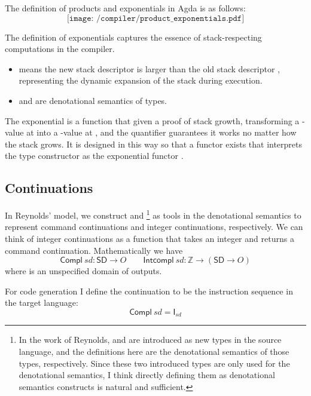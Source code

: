 \documentclass[12pt,a4paper]{report}
\theoremstyle{definition}
\newcommand{\bZ}{\ensuremath{\mathbb{Z}}}
\newcommand{\intp}[1]{\left\llbracket #1 \right\rrbracket}
\begin{document}
    The definition of products and exponentials in Agda is as follows:
    \[\texttt{[image: /compiler/product\_exponentials.pdf]}\]

    The definition of exponentials captures the essence of stack-respecting computations in the compiler. 
    \begin{itemize}
        \item {} means the new stack descriptor  is larger than the old stack descriptor , representing the dynamic expansion of the stack during execution.

        \item {} and  are denotational semantics of types. 
    \end{itemize}
    The exponential  is a function that given a proof of stack growth, transforming a -value at  into a -value at , and the  quantifier guarantees it works no matter how the stack grows. It is designed in this way so that a functor \text{\intp{-} : \Theta \to \mathcal{K}} exists that interprets the type constructor \text{\Rightarrow} as the exponential functor .

    \subsection{Continuations}
    In Reynolds' model, we construct  and \footnote{In the work of Reynolds,  and  are introduced as new types in the source language, and the definitions here are the denotational semantics of those types, respectively. Since these two introduced types are only used for the denotational semantics, I think directly defining them as denotational semantics constructs is natural and sufficient.} as tools in the denotational semantics to represent command continuations and integer continuations, respectively. We can think of integer continuations as a function that takes an integer and returns a command continuation. Mathematically we have
    \[\mathsf{Compl}\ \textit{sd} : \mathsf{SD} \to O \qquad \mathsf{Intcompl}\ \textit{sd} : \bZ \to (\mathsf{SD} \to O)\]
    where  is an unspecified domain of outputs.

    For code generation I define the continuation to be the instruction sequence in the target language:
    \[\mathsf{Compl}\ \textit{sd} = \textsf{I}_{\textit{sd}}\]
\end{document}
